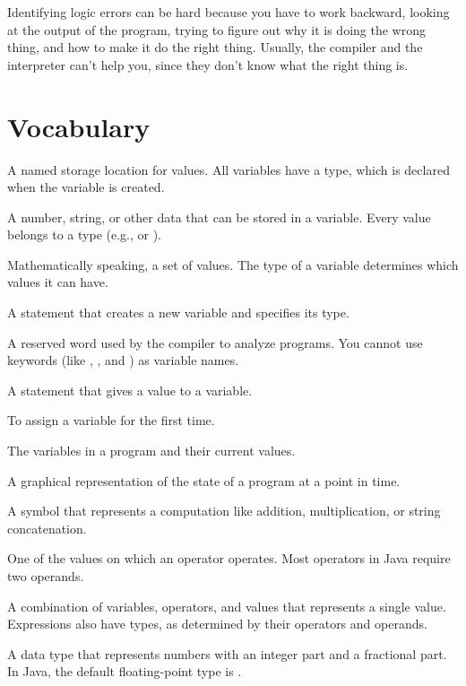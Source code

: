 Identifying logic errors can be hard because you have to work backward, looking at the output of the program, trying to figure out why it is doing the wrong thing, and how to make it do the right thing.
Usually, the compiler and the interpreter can't help you, since they don't know what the right thing is.


\section{Vocabulary}

\begin{description}

A named storage location for values.
All variables have a type, which is declared when the variable is created.

A number, string, or other data that can be stored in a variable.
Every value belongs to a type (e.g.,  or ).

Mathematically speaking, a set of values.
The type of a variable determines which values it can have.

A statement that creates a new variable and specifies its type.

A reserved word used by the compiler to analyze programs.
You cannot use keywords (like , , and ) as variable names.

A statement that gives a value to a variable.

To assign a variable for the first time.


The variables in a program and their current values.

A graphical representation of the state of a program at a point in time.

A symbol that represents a computation like addition, multiplication, or string concatenation.

One of the values on which an operator operates.
Most operators in Java require two operands.

A combination of variables, operators, and values that represents a single value.
Expressions also have types, as determined by their operators and operands.

A data type that represents numbers with an integer part and a fractional part.
In Java, the default floating-point type is .


\end{description}
